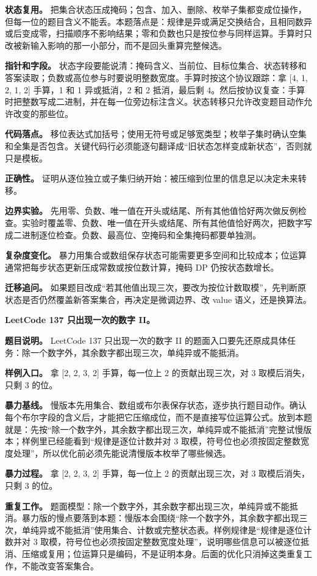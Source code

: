 \textbf{状态复用。} 把集合状态压成掩码；包含、加入、删除、枚举子集都变成位操作，但每一位的题目含义不能丢。本题落点是：规律是异或满足交换结合，且相同数异或后变成零，扫描顺序不影响结果；零和负数也只是按位参与同样运算。手算时只改被新输入影响的那一小部分，而不是回头重算完整候选。

\textbf{指针和字段。} 状态字段要能说清：掩码含义、当前位、目标位集合、状态转移和答案读取；负数或高位参与时要说明整数宽度。手算时按这个协议跟踪：拿 [4, 1, 2, 1, 2] 手算，1 和 1 异或抵消，2 和 2 抵消，最后剩 4。然后按协议复查：手算时把整数写成二进制，并在每一位旁边标注含义。状态转移只允许改变题目动作允许改变的那些位。

\textbf{代码落点。} 移位表达式加括号；使用无符号或足够宽类型；枚举子集时确认空集和全集是否包含。关键代码行必须能逐句翻译成“旧状态怎样变成新状态”，否则就只是模板。

\textbf{正确性。} 证明从逐位独立或子集归纳开始：被压缩到位里的信息足以决定未来转移。

\textbf{边界实验。} 先用零、负数、唯一值在开头或结尾、所有其他值恰好两次做反例检查。实验时覆盖零、负数、唯一值在开头或结尾、所有其他值恰好两次，把数字写成二进制逐位检查。负数、最高位、空掩码和全集掩码都要单独测。

\textbf{复杂度变化。} 暴力用集合或数组保存状态可能需要更多空间和比较成本；位运算通常把每步状态更新压成常数或按位数计算，掩码 DP 仍按状态数增长。

\textbf{迁移追问。} 如果题目改成“若其他值出现三次，要改为按位计数取模”，先判断原状态是否仍然覆盖新答案集合，再决定是微调边界、改 value 语义，还是换算法。

\noindent\textbf{LeetCode 137 只出现一次的数字 II。}

\textbf{题目说明。} LeetCode 137 只出现一次的数字 II 的题面入口要先还原成具体任务：除一个数字外，其余数字都出现三次，单纯异或不能抵消。

\textbf{样例入口。} 拿 [2, 2, 3, 2] 手算，每一位上 2 的贡献出现三次，对 3 取模后消失，只剩 3 的位。

\textbf{暴力基线。} 慢版本先用集合、数组或布尔表保存状态，逐步执行题目动作。确认每个布尔字段的含义后，才能把它压缩成位，而不是直接写位运算公式。放到本题就是：先按“除一个数字外，其余数字都出现三次，单纯异或不能抵消”完整试慢版本；样例里已经能看到“规律是逐位计数并对 3 取模，符号位也必须按固定整数宽度处理”，所以优化前必须先能说清慢版本枚举了哪些候选。

\textbf{暴力过程。} 拿 [2, 2, 3, 2] 手算，每一位上 2 的贡献出现三次，对 3 取模后消失，只剩 3 的位。

\textbf{重复工作。} 题面模型：除一个数字外，其余数字都出现三次，单纯异或不能抵消。暴力版的慢点要落到本题：慢版本会围绕“除一个数字外，其余数字都出现三次，单纯异或不能抵消”使用集合、计数或完整状态表。样例规律是“规律是逐位计数并对 3 取模，符号位也必须按固定整数宽度处理”，说明哪些信息可以被逐位抵消、压缩或复用；位运算只是编码，不是证明本身。后面的优化只消掉这类重复工作，不能改变答案集合。

